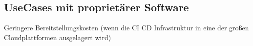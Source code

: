 \subsection{UseCases mit proprietärer Software}
\label{UseCases mit proprietärer Software}

Geringere Bereitstellungskosten (wenn die CI CD Infrastruktur in eine der großen Cloudplattformen ausgelagert wird)
